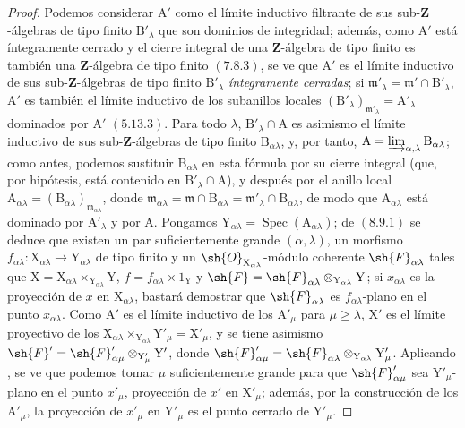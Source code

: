 \begin{proof}
\medskip
Podemos considerar $\mathrm{A}'$ como el límite inductivo filtrante de sus sub-$\mathbf{Z}$-álgebras de tipo finito
$\mathrm{B}'_\lambda$ que son dominios de integridad; además, como $\mathrm{A}'$ está íntegramente cerrado y el cierre
integral de una $\mathbf{Z}$-álgebra de tipo finito es también una $\mathbf{Z}$-álgebra de tipo finito $(7.8.3)$, se
ve que $\mathrm{A}'$ es el límite inductivo de sus sub-$\mathbf{Z}$-álgebras de tipo finito $\mathrm{B}'_\lambda$ \emph{íntegramente cerradas};
si $\mathfrak{m}'_\lambda=\mathfrak{m}'\cap\mathrm{B}'_\lambda$, $\mathrm{A}'$ es también el límite inductivo de los subanillos locales $(\mathrm{B}'_\lambda)_{\mathfrak{m}'_\lambda}=\mathrm{A}'_\lambda$
dominados por $\mathrm{A}'$ $(5.13.3)$. Para todo $\lambda$, $\mathrm{B}'_\lambda\cap\mathrm{A}$ es asimismo el límite inductivo de sus
sub-$\mathbf{Z}$-álgebras de tipo finito $\mathrm{B}_{\alpha\lambda}$, y, por tanto, $\mathrm{A}=\varinjlim_{\alpha,\lambda}\mathrm{B}_{\alpha\lambda}$; como antes, podemos sustituir $\mathrm{B}_{\alpha\lambda}$
en esta fórmula por su cierre integral (que, por hipótesis, está contenido en $\mathrm{B}'_\lambda\cap\mathrm{A}$), y después por el anillo local
$\mathrm{A}_{\alpha\lambda}=(\mathrm{B}_{\alpha\lambda})_{\mathfrak{m}_{\alpha\lambda}}$, donde
$\mathfrak{m}_{\alpha\lambda}=\mathfrak{m}\cap\mathrm{B}_{\alpha\lambda}=\mathfrak{m}'_\lambda\cap\mathrm{B}_{\alpha\lambda}$, de modo que $\mathrm{A}_{\alpha\lambda}$ está dominado por $\mathrm{A}'_\lambda$ y por $\mathrm{A}$.
Pongamos $\mathrm{Y}_{\alpha\lambda}=\operatorname{Spec}(\mathrm{A}_{\alpha\lambda})$; de $(8.9.1)$ se deduce que existen un par suficientemente grande
$(\alpha,\lambda)$, un morfismo $f_{\alpha\lambda}:\mathrm{X}_{\alpha\lambda}\to\mathrm{Y}_{\alpha\lambda}$ de tipo finito y un
$\sh{O}_{\mathrm{X}_{\alpha\lambda}}$-módulo coherente $\sh{F}_{\alpha\lambda}$ tales que
$\mathrm{X}=\mathrm{X}_{\alpha\lambda}\times_{\mathrm{Y}_{\alpha\lambda}}\mathrm{Y}$,
$f=f_{\alpha\lambda}\times 1_\mathrm{Y}$ y $\sh{F}=\sh{F}_{\alpha\lambda}\otimes_{\mathrm{Y}_{\alpha\lambda}}\mathrm{Y}$; si $x_{\alpha\lambda}$
es la proyección de $x$ en $\mathrm{X}_{\alpha\lambda}$, bastará demostrar que $\sh{F}_{\alpha\lambda}$ es $f_{\alpha\lambda}$-plano en el punto $x_{\alpha\lambda}$.
Como $\mathrm{A}'$ es el límite inductivo de los $\mathrm{A}'_\mu$ para $\mu\geq\lambda$, $\mathrm{X}'$ es el límite proyectivo de los
$\mathrm{X}_{\alpha\lambda}\times_{\mathrm{Y}_{\alpha\lambda}}\mathrm{Y}'_\mu=\mathrm{X}'_\mu$, y se tiene asimismo
$\sh{F}'=\sh{F}'_{\alpha\mu}\otimes_{\mathrm{Y}'_\mu}\mathrm{Y}'$, donde
$\sh{F}'_{\alpha\mu}=\sh{F}_{\alpha\lambda}\otimes_{\mathrm{Y}_{\alpha\lambda}}\mathrm{Y}'_\mu$. Aplicando
, se ve que podemos tomar $\mu$ suficientemente grande para que $\sh{F}'_{\alpha\mu}$ sea $\mathrm{Y}'_\mu$-plano en el
punto $x'_\mu$, proyección de $x'$ en $\mathrm{X}'_\mu$; además, por la construcción de los $\mathrm{A}'_\mu$, la proyección
de $x'_\mu$ en $\mathrm{Y}'_\mu$ es el punto cerrado de $\mathrm{Y}'_\mu$.


\end{proof}
